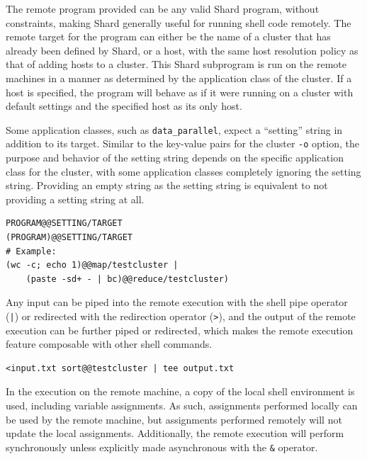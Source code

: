 \documentclass[twoside]{report}
\begin{document}
The remote program provided can be any valid Shard program, without constraints, making Shard generally useful for running shell code remotely.
The remote target for the program can either be the name of a cluster that has already been defined by Shard, or a host, with the same host resolution policy as that of adding hosts to a cluster.
This Shard subprogram is run on the remote machines in a manner as determined by the application class of the cluster.
If a host is specified, the program will behave as if it were running on a cluster with default settings and the specified host as its only host.

Some application classes, such as \texttt{data\_parallel}, expect a ``setting'' string in addition to its target.
Similar to the key-value pairs for the cluster \texttt{-o} option, the purpose and behavior of the setting string depends on the specific application class for the cluster, with some application classes completely ignoring the setting string.
Providing an empty string as the setting string is equivalent to not providing a setting string at all.

\begin{minipage}[c]{\textwidth-15pt}
  \begin{lstlisting}[language=Shard]
PROGRAM@@SETTING/TARGET
(PROGRAM)@@SETTING/TARGET
# Example:
(wc -c; echo 1)@@map/testcluster |
    (paste -sd+ - | bc)@@reduce/testcluster)
\end{lstlisting}
  \smallskip
\end{minipage}

Any input can be piped into the remote execution with the shell pipe operator (\texttt{|}) or redirected with the redirection operator (\texttt{>}), and the output of the remote execution can be further piped or redirected, which makes the remote execution feature composable with other shell commands.

\begin{minipage}[c]{\textwidth-15pt}
  \begin{lstlisting}[language=Shard]
<input.txt sort@@testcluster | tee output.txt
\end{lstlisting}
  \smallskip
\end{minipage}

In the execution on the remote machine, a copy of the local shell environment is used, including variable assignments.
As such, assignments performed locally can be used by the remote machine, but assignments performed remotely will not update the local assignments.
Additionally, the remote execution will perform synchronously unless explicitly made asynchronous with the \texttt{\&} operator.
\end{document}
